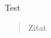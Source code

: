 \renewcommand{\familydefault}{\sfdefault}
\usepackage{test}


Test

\begin{quotation}
Zitat
\end{quotation}


